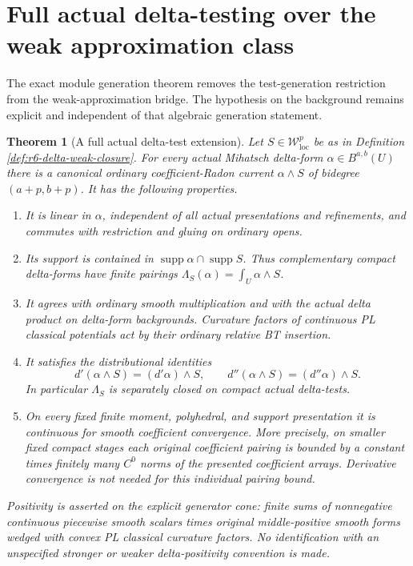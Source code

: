 \documentclass[11pt,a4paper]{article}
\numberwithin{equation}{section}
\newtheorem{theorem}{Theorem}[section]
\theoremstyle{definition}
\theoremstyle{remark}
\begin{document}
\section{Full actual delta-testing over the weak approximation class}
\label{sec:r6-full-delta-tests}

The exact module generation theorem removes the test-generation
restriction from the weak-approximation bridge. The hypothesis on
the background remains explicit and independent of that algebraic
generation statement.

\begin{theorem}[A full actual delta-test extension]
\label{thm:r6-full-delta-test-extension}
Let $S\in\mathcal W^p_{\mathrm{loc}}$ be as in Definition
\ref{def:r6-delta-weak-closure}. For every actual Mihatsch
delta-form $\alpha\in B^{a,b}(U)$ there is a canonical ordinary
coefficient-Radon current $\alpha\wedge S$ of bidegree
$(a+p,b+p)$. It has the following properties.
\begin{enumerate}
\item It is linear in $\alpha$, independent of all actual
      presentations and refinements, and commutes with
      restriction and gluing on ordinary opens.
\item Its support is contained in
      $\operatorname{supp}\alpha\cap\operatorname{supp}S$.
      Thus complementary compact delta-forms have finite
      pairings $\Lambda_S(\alpha)=\int_U\alpha\wedge S$.
\item It agrees with ordinary smooth multiplication and
      with the actual delta product on delta-form backgrounds.
      Curvature factors of continuous PL classical potentials
      act by their ordinary relative BT insertion.
\item It satisfies the distributional identities
      \[
       d'(\alpha\wedge S)=(d'\alpha)\wedge S,
       \qquad
       d''(\alpha\wedge S)=(d''\alpha)\wedge S.
      \]
      In particular $\Lambda_S$ is separately closed on
      compact actual delta-tests.
\item On every fixed finite moment, polyhedral, and support
      presentation it is continuous for smooth coefficient
      convergence. More precisely, on smaller fixed compact
      stages each original coefficient pairing is bounded by
      a constant times finitely many $C^0$ norms of the
      presented coefficient arrays. Derivative convergence
      is not needed for this individual pairing bound.
\end{enumerate}
Positivity is asserted on the explicit generator cone:
finite sums of nonnegative continuous piecewise smooth
scalars times original middle-positive smooth forms wedged
with convex PL classical curvature factors. No identification
with an unspecified stronger or weaker delta-positivity
convention is made.
\end{theorem}
\end{document}
